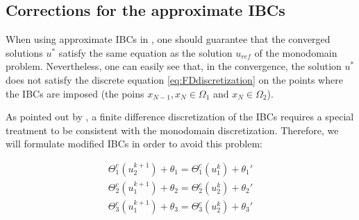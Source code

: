 \endgroup


\subsection{Corrections for the approximate IBCs}

\indent When using approximate IBCs in , one should guarantee that the converged solutions $u^*$ satisfy the same equation as the solution $u_{ref}$ of the monodomain problem. Nevertheless, one can easily see that, in the convergence, the solution $u^*$ does not satisfy the discrete equation \eqref{eq:FDdiscretization} on the points where the IBCs are imposed (the poins $x_{N-1},x_N \in \Omega_1$ and $x_N \in \Omega_2$). 

\indent As pointed out by \cite{Gander2001}, a finite difference discretization of the IBCs requires a special treatment to be consistent with the monodomain discretization. Therefore, we will formulate modified IBCs  in order to avoid this problem:

\begin{equation}
	\label{eq:correctedTBC}
    \begin{gathered}
        \Theta_1^{c}(u_2^{k+1}) + \theta_1 = \Theta_1^{c}(u_1^{k}) + \theta_1' \\
        \Theta_2^{c}(u_1^{k+1}) + \theta_2 = \Theta_2^{c}(u_2^{k}) + \theta_2' \\
        \Theta_3^{c}(u_1^{k+1}) + \theta_3 = \Theta_3^{c}(u_2^{k}) + \theta_3'
    \end{gathered}
\end{equation}

